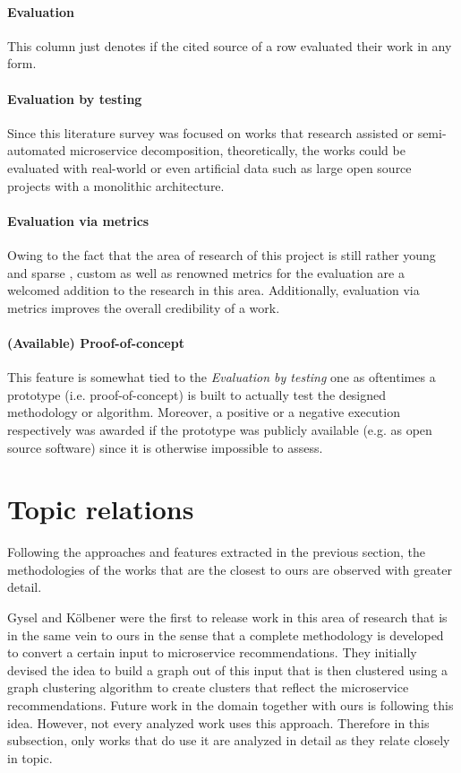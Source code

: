 \documentclass[12pt,a4paper]{report}
\begin{document}
\paragraph{Evaluation}
This column just denotes if the cited source of a row evaluated their work in any form.
\paragraph{Evaluation by testing}
Since this literature survey was focused on works that research assisted or semi-automated
microservice decomposition, theoretically, the works could be evaluated with real-world or
even artificial data such as large open source projects with a monolithic architecture.
\paragraph{Evaluation via metrics}
Owing to the fact that the area of research of this project is still rather young and sparse
\cite{jin2018functionality}\cite{fritzsch2018monolith}, custom as well as renowned metrics
for the evaluation are a welcomed addition to the research in this area.
Additionally, evaluation via metrics improves the overall credibility of a work.
\paragraph{(Available) Proof-of-concept}
This feature is somewhat tied to the \textit{Evaluation by testing} one as oftentimes
a prototype (i.e. proof-of-concept) is built to actually test the designed
methodology or algorithm. Moreover, a positive or a negative execution respectively
was awarded if the prototype was publicly available (e.g. as open source software)
since it is otherwise impossible to assess.



\section{Topic relations} \label{subsect:topic-relations}

Following the approaches and features extracted in the previous section,
the methodologies of the works that are the closest to ours are observed with greater detail.

Gysel and K{\"o}lbener \cite{gysel2016service} were the first to release work in
this area of research that is in the same vein to ours in the sense that a
complete methodology is developed to convert a certain input to microservice
recommendations. They initially devised the idea to build a graph out of this
input that is then clustered using a graph clustering algorithm to create clusters
that reflect the microservice recommendations.
Future work in the domain \cite{mazlami2017extraction, kruidenberg2018monoliths}
together with ours is following this idea.
However, not every analyzed work uses this approach.
Therefore in this subsection, only works that do use it are analyzed in detail
as they relate closely in topic.
\end{document}
